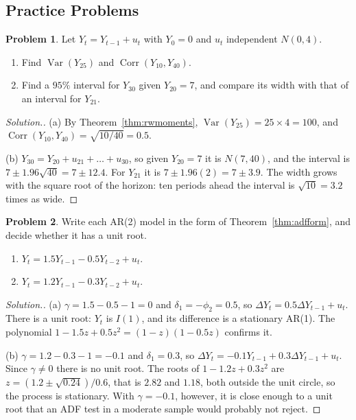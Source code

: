 \documentclass[11pt,a4paper]{article}
\numberwithin{equation}{section}
\DeclareMathOperator{\Var}{Var}
\DeclareMathOperator{\Corr}{Corr}
\theoremstyle{definition}
\newtheorem{problemx}{Problem}[subsection]
\newenvironment{problem}{\begin{problemx}}{\end{problemx}}
\newenvironment{solution}
  {\renewcommand{\qedsymbol}{}\begin{proof}[\textit{Solution}.]}
  {\end{proof}}
\begin{document}
\subsection{Practice Problems}

\begin{problem}
Let $Y_t = Y_{t-1} + u_t$ with $Y_0 = 0$ and $u_t$ independent $N(0, 4)$.
\begin{enumerate}[label=(\alph*)]
\item Find $\Var(Y_{25})$ and $\Corr(Y_{10}, Y_{40})$.
\item Find a $95\%$ interval for $Y_{30}$ given $Y_{20} = 7$, and compare its width with that of an interval for $Y_{21}$.
\end{enumerate}
\end{problem}

\begin{solution}
(a) By Theorem~\ref{thm:rwmoments}, $\Var(Y_{25}) = 25 \times 4 = 100$, and $\Corr(Y_{10}, Y_{40}) = \sqrt{10/40} = 0.5$.

(b) $Y_{30} = Y_{20} + u_{21} + \dots + u_{30}$, so given $Y_{20} = 7$ it is $N(7, 40)$, and the interval is $7 \pm 1.96\sqrt{40} = 7 \pm 12.4$. For $Y_{21}$ it is $7 \pm 1.96(2) = 7 \pm 3.9$. The
width grows with the square root of the horizon: ten periods ahead the interval is $\sqrt{10} = 3.2$ times as wide.
\end{solution}

\begin{problem}
Write each AR(2) model in the form of Theorem~\ref{thm:adfform}, and decide whether it has a unit root.
\begin{enumerate}[label=(\alph*)]
\item $Y_t = 1.5Y_{t-1} - 0.5Y_{t-2} + u_t$.
\item $Y_t = 1.2Y_{t-1} - 0.3Y_{t-2} + u_t$.
\end{enumerate}
\end{problem}

\begin{solution}
(a) $\gamma = 1.5 - 0.5 - 1 = 0$ and $\delta_1 = -\phi_2 = 0.5$, so $\Delta Y_t = 0.5\Delta Y_{t-1} + u_t$. There is a unit root: $Y_t$ is $I(1)$, and its difference is a stationary AR(1). The
polynomial $1 - 1.5z + 0.5z^2 = (1 - z)(1 - 0.5z)$ confirms it.

(b) $\gamma = 1.2 - 0.3 - 1 = -0.1$ and $\delta_1 = 0.3$, so $\Delta Y_t = -0.1Y_{t-1} + 0.3\Delta Y_{t-1} + u_t$. Since $\gamma \neq 0$ there is no unit root. The roots of $1 - 1.2z + 0.3z^2$ are
$z = (1.2 \pm \sqrt{0.24})/0.6$, that is $2.82$ and $1.18$, both outside the unit circle, so the process is stationary. With $\gamma = -0.1$, however, it is close enough to a unit
root that an ADF test in a moderate sample would probably not reject.
\end{solution}
\end{document}
